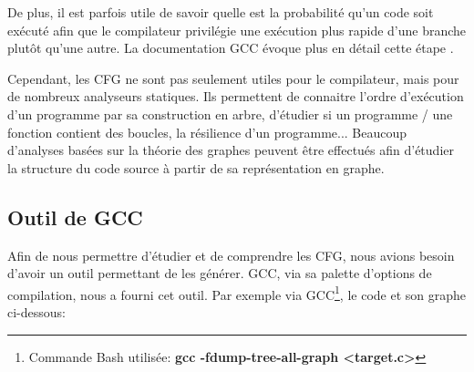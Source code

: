 De plus, il est parfois utile de savoir quelle est la probabilité qu'un code soit exécuté afin que le compilateur privilégie une exécution plus rapide d'une branche plutôt qu'une autre. La documentation GCC évoque plus en détail cette étape \cite{gcc:cfg}.

Cependant, les CFG ne sont pas seulement utiles pour le compilateur, mais pour de nombreux analyseurs statiques. Ils permettent de connaitre l'ordre d'exécution d'un programme par sa construction en arbre, d'étudier si un programme / une fonction contient des boucles, la résilience d'un programme... Beaucoup d'analyses basées sur la théorie des graphes peuvent être effectués afin d'étudier la structure du code source à partir de sa représentation en graphe.

\subsection{Outil de GCC}
Afin de nous permettre d'étudier et de comprendre les CFG, nous avions besoin d'avoir un outil permettant de les générer. GCC, via sa palette d'options de compilation, nous a fourni cet outil. Par exemple via GCC\footnote{Commande Bash utilisée: \textbf{gcc -fdump-tree-all-graph <target.c>}}, le code et son graphe ci-dessous:
